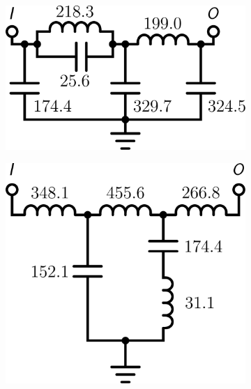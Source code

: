 \begin{figure}
\centering
\begin{subfigure}[t]{0.25\textwidth}
\centering
\includegraphics[scale = 0.14]{../ch6/figures/lpf2_circuit1}
\caption{\label{fig:lpf2_circuita}}
\end{subfigure}%
\begin{subfigure}[t]{0.25\textwidth}
\centering
\includegraphics[scale = 0.14]{../ch6/figures/lpf2_circuit2}
\caption{\label{fig:lpf2_circuitb}}
\end{subfigure}%
\begin{subfigure}[t]{0.5\textwidth}
\centering

\end{subfigure}
\end{figure}
